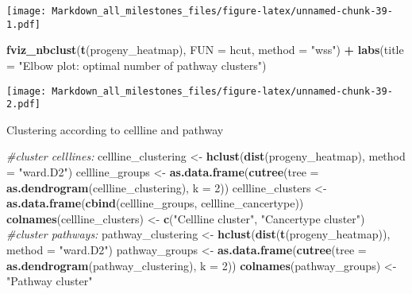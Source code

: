 \documentclass[]{article}
\newenvironment{Shaded}{\begin{snugshade}}{\end{snugshade}}
\newcommand{\CommentTok}[1]{\textcolor[rgb]{0.56,0.35,0.01}{\textit{#1}}}
\newcommand{\DataTypeTok}[1]{\textcolor[rgb]{0.13,0.29,0.53}{#1}}
\newcommand{\DecValTok}[1]{\textcolor[rgb]{0.00,0.00,0.81}{#1}}
\newcommand{\KeywordTok}[1]{\textcolor[rgb]{0.13,0.29,0.53}{\textbf{#1}}}
\newcommand{\NormalTok}[1]{#1}
\newcommand{\OperatorTok}[1]{\textcolor[rgb]{0.81,0.36,0.00}{\textbf{#1}}}
\newcommand{\StringTok}[1]{\textcolor[rgb]{0.31,0.60,0.02}{#1}}
\begin{document}
\texttt{[image: Markdown\_all\_milestones\_files/figure-latex/unnamed-chunk-39-1.pdf]}

\begin{Shaded}
\begin{Highlighting}[]
\KeywordTok{fviz_nbclust}\NormalTok{(}\KeywordTok{t}\NormalTok{(progeny_heatmap), }
             \DataTypeTok{FUN =}\NormalTok{ hcut, }
             \DataTypeTok{method =} \StringTok{"wss"}\NormalTok{) }\OperatorTok{+}
\StringTok{  }\KeywordTok{labs}\NormalTok{(}\DataTypeTok{title =} \StringTok{"Elbow plot: optimal number of pathway clusters"}\NormalTok{)}
\end{Highlighting}
\end{Shaded}

\texttt{[image: Markdown\_all\_milestones\_files/figure-latex/unnamed-chunk-39-2.pdf]}

Clustering according to cellline and pathway

\begin{Shaded}
\begin{Highlighting}[]
\CommentTok{#cluster celllines:}
\NormalTok{cellline_clustering <-}\StringTok{ }\KeywordTok{hclust}\NormalTok{(}\KeywordTok{dist}\NormalTok{(progeny_heatmap), }\DataTypeTok{method =} \StringTok{"ward.D2"}\NormalTok{)}
\NormalTok{cellline_groups <-}\StringTok{ }\KeywordTok{as.data.frame}\NormalTok{(}\KeywordTok{cutree}\NormalTok{(}\DataTypeTok{tree =} \KeywordTok{as.dendrogram}\NormalTok{(cellline_clustering), }\DataTypeTok{k =} \DecValTok{2}\NormalTok{))}
\NormalTok{cellline_clusters <-}\StringTok{ }\KeywordTok{as.data.frame}\NormalTok{(}\KeywordTok{cbind}\NormalTok{(cellline_groups, cellline_cancertype))}
\KeywordTok{colnames}\NormalTok{(cellline_clusters) <-}\StringTok{ }\KeywordTok{c}\NormalTok{(}\StringTok{"Cellline cluster"}\NormalTok{, }\StringTok{"Cancertype cluster"}\NormalTok{)}
\CommentTok{#cluster pathways:}
\NormalTok{pathway_clustering <-}\StringTok{ }\KeywordTok{hclust}\NormalTok{(}\KeywordTok{dist}\NormalTok{(}\KeywordTok{t}\NormalTok{(progeny_heatmap)), }\DataTypeTok{method =} \StringTok{"ward.D2"}\NormalTok{) }
\NormalTok{pathway_groups <-}\StringTok{ }\KeywordTok{as.data.frame}\NormalTok{(}\KeywordTok{cutree}\NormalTok{(}\DataTypeTok{tree =} \KeywordTok{as.dendrogram}\NormalTok{(pathway_clustering), }\DataTypeTok{k =} \DecValTok{2}\NormalTok{))}
\KeywordTok{colnames}\NormalTok{(pathway_groups) <-}\StringTok{ "Pathway cluster"}
\end{Highlighting}
\end{Shaded}
\end{document}
